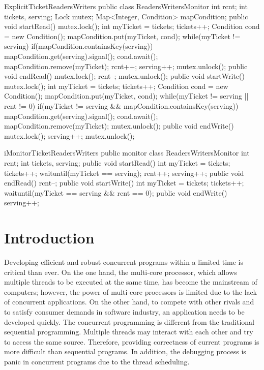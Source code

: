 \documentclass[preprint]{sigplanconf}
\begin{document}
\begin{SaveVerbatim}{ExplicitTicketReadersWriters}
public class ReadersWritersMonitor {
  int rcnt;
  int tickets, serving;
  Lock mutex;
  Map<Integer, Condition> mapCondition;
  public void startRead() {
    mutex.lock();
    int myTicket = tickets;
    tickets++;
    Condition cond = new Condition();
    mapCondition.put(myTicket, cond);
    while(myTicket != serving) {
      if(mapCondition.containsKey(serving)) {
         mapCondition.get(serving).signal();
      }
      cond.await();
    }
    mapCondition.remove(myTicket);
    rcnt++;
    serving++;
    mutex.unlock();
  }
  public void endRead() {
    mutex.lock();
    rcnt--;
    mutex.unlock();
  }
  public void startWrite() {
    mutex.lock();
    int myTicket = tickets;
    tickets++;
    Condition cond = new Condition();
    mapCondition.put(myTicket, cond);
    while(myTicket != serving || rcnt != 0) {
      if(myTicket != serving &&
           mapCondition.containsKey(serving)) {
         mapCondition.get(serving).signal();
      }
      cond.await();
    }
    mapCondition.remove(myTicket);
    mutex.unlock();
  }
  public void endWrite() {
    mutex.lock();
    serving++;
    mutex.unlock();
  }
}
\end{SaveVerbatim}

\begin{SaveVerbatim}{iMonitorTicketReadersWriters}
public monitor class ReadersWritersMonitor {
  int rcnt;
  int tickets, serving;
  public void startRead() {
    int myTicket = tickets;
    tickets++;
    waituntil(myTicket == serving);
    rcnt++;
    serving++;
  }
  public void endRead() {
    rcnt--;
  }
  public void startWrite() {
    int myTicket = tickets;
    tickets++; 
    waituntil(myTicket == serving && rcnt == 0);
  }
  public void endWrite() {
    serving++;
  }
}
\end{SaveVerbatim}

\section{Introduction} \label{sec:intro}
Developing efficient and robust concurrent programs within a limited time is 
critical than ever. On the one hand, the multi-core processor, which allows 
multiple threads to be executed at the same time, has become the mainstream of 
computers; however, the power of multi-core processors is limited due to the 
lack of concurrent applications. On the other hand, to compete with other rivals
and to satisfy consumer demands in software industry, an application needs to be
developed quickly. The concurrent programming is 
different from the traditional sequential programming. Multiple threads may 
interact with each other and try to access the same source. Therefore, providing
correctness of current programs is more difficult than sequential programs. In 
addition, the debugging process is panic in concurrent programs due to the 
thread scheduling. 
\end{document}
